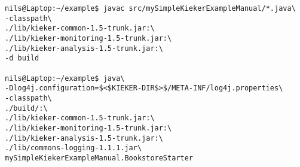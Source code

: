 \begin{lstlisting} 			
nils@Laptop:~/example$ javac src/mySimpleKiekerExampleManual/*.java\
-classpath\ 		
./lib/kieker-common-1.5-trunk.jar:\
./lib/kieker-monitoring-1.5-trunk.jar:\
./lib/kieker-analysis-1.5-trunk.jar:\
-d build

nils@Laptop:~/example$ java\
-Dlog4j.configuration=$<$KIEKER-DIR$>$/META-INF/log4j.properties\
-classpath\ 	
./build/:\
./lib/kieker-common-1.5-trunk.jar:\
./lib/kieker-monitoring-1.5-trunk.jar:\
./lib/kieker-analysis-1.5-trunk.jar:\
./lib/commons-logging-1.1.1.jar\
mySimpleKiekerExampleManual.BookstoreStarter 
\end{lstlisting}	